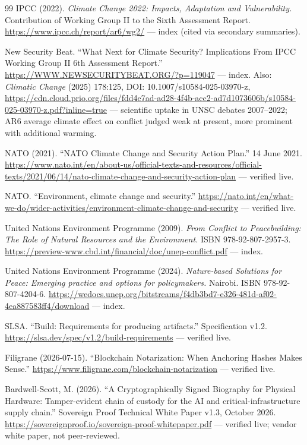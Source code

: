 \documentclass[11pt]{article}
\begin{document}
\begin{thebibliography}{99}
 IPCC (2022). \emph{Climate Change 2022: Impacts,
Adaptation and Vulnerability.} Contribution of Working Group II to the
Sixth Assessment Report. \url{https://www.ipcc.ch/report/ar6/wg2/} ---
index (cited via secondary summaries).

 New Security Beat. ``What Next for Climate
Security? Implications From IPCC Working Group II 6th Assessment
Report.''
\url{https://WWW.NEWSECURITYBEAT.ORG/?p=119047} --- index. Also:
\emph{Climatic Change} (2025) 178:125, DOI: 10.1007/s10584-025-03970-z,
\url{https://cdn.cloud.prio.org/files/fdd4e7ad-ad28-4f4b-acc2-ad7d1073606b/s10584-025-03970-z.pdf?inline=true}
--- scientific uptake in UNSC debates 2007--2022; AR6 average climate
effect on conflict judged weak at present, more prominent with
additional warming.

 NATO (2021). ``NATO Climate Change and Security
Action Plan.'' 14 June 2021.
\url{https://www.nato.int/en/about-us/official-texts-and-resources/official-texts/2021/06/14/nato-climate-change-and-security-action-plan}
--- verified live.

 NATO. ``Environment, climate change and
security.''
\url{https://nato.int/en/what-we-do/wider-activities/environment-climate-change-and-security}
--- verified live.

 United Nations Environment Programme (2009).
\emph{From Conflict to Peacebuilding: The Role of Natural Resources and
the Environment.} ISBN 978-92-807-2957-3.
\url{https://preview-www.cbd.int/financial/doc/unep-conflict.pdf} ---
index.

 United Nations Environment Programme (2024).
\emph{Nature-based Solutions for Peace: Emerging practice and options
for policymakers.} Nairobi. ISBN 978-92-807-4204-6.
\url{https://wedocs.unep.org/bitstreams/f4db3bd7-e326-481d-af02-4ea887583ff4/download}
--- index.

 SLSA. ``Build: Requirements for producing artifacts.''
Specification v1.2.
\url{https://slsa.dev/spec/v1.2/build-requirements} --- verified live.

 Filigrane (2026-07-15). ``Blockchain
Notarization: When Anchoring Hashes Makes Sense.''
\url{https://www.filigrane.com/blockchain-notarization} --- verified
live.

 Bardwell-Scott, M. (2026). ``A Cryptographically
Signed Biography for Physical Hardware: Tamper-evident chain of custody
for the AI and critical-infrastructure supply chain.'' Sovereign Proof
Technical White Paper v1.3, October 2026.
\url{https://sovereignproof.io/sovereign-proof-whitepaper.pdf} ---
verified live; vendor white paper, not peer-reviewed.


\end{thebibliography}
\end{document}
